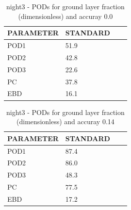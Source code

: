 \begin{table}[p!]
\begin{center}
\begin{tabular}{|l|l|l|l|}
\hline
\multicolumn{1}{|c|}{\cellcolor[HTML]{C0C0C0}\textbf{PARAMETER}} & \multicolumn{1}{c|}{\cellcolor[HTML]{C0C0C0}\textbf{STANDARD}} \\
\hline
\cellcolor[HTML]{C0C0C0}POD1  & 51.9                                \\
\cellcolor[HTML]{C0C0C0}POD2  & 42.8                                \\
\cellcolor[HTML]{C0C0C0}POD3  & 22.6                                \\
\cellcolor[HTML]{C0C0C0}PC    & 37.8                                  \\
\cellcolor[HTML]{C0C0C0}EBD   & 16.1                                 \\
\hline
\end{tabular}
\caption{night3 - PODs for ground layer fraction (dimensionless) and accuray 0.0}
\label{tab:podglf0.0:night3}
\end{center}
\end{table}
\begin{table}[p!]
\begin{center}
\begin{tabular}{|l|l|l|l|}
\hline
\multicolumn{1}{|c|}{\cellcolor[HTML]{C0C0C0}\textbf{PARAMETER}} & \multicolumn{1}{c|}{\cellcolor[HTML]{C0C0C0}\textbf{STANDARD}} \\
\hline
\cellcolor[HTML]{C0C0C0}POD1  & 87.4                                \\
\cellcolor[HTML]{C0C0C0}POD2  & 86.0                                \\
\cellcolor[HTML]{C0C0C0}POD3  & 48.3                                \\
\cellcolor[HTML]{C0C0C0}PC    & 77.5                                  \\
\cellcolor[HTML]{C0C0C0}EBD   & 17.2                                 \\
\hline
\end{tabular}
\caption{night3 - PODs for ground layer fraction (dimensionless) and accuray 0.14}
\label{tab:podglf0.14:night3}
\end{center}
\end{table}
